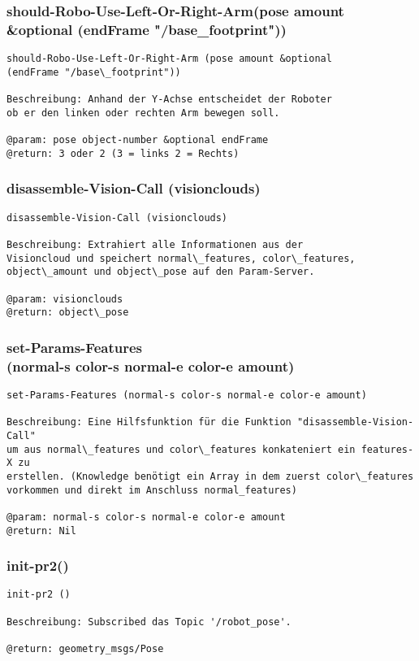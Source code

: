 \documentclass{suturo}
\begin{document}
\subsubsection{should-Robo-Use-Left-Or-Right-Arm(pose amount \\
\&optional (endFrame "/base\_footprint"))}
\begin{verbatim}
should-Robo-Use-Left-Or-Right-Arm (pose amount &optional
(endFrame "/base\_footprint"))

Beschreibung: Anhand der Y-Achse entscheidet der Roboter
ob er den linken oder rechten Arm bewegen soll.

@param: pose object-number &optional endFrame
@return: 3 oder 2 (3 = links 2 = Rechts)
\end{verbatim}


\subsubsection{disassemble-Vision-Call (visionclouds)}
\begin{verbatim}
disassemble-Vision-Call (visionclouds)

Beschreibung: Extrahiert alle Informationen aus der 
Visioncloud und speichert normal\_features, color\_features, 
object\_amount und object\_pose auf den Param-Server.
 
@param: visionclouds
@return: object\_pose
\end{verbatim}



\subsubsection{set-Params-Features \\
(normal-s color-s normal-e color-e amount)}
\begin{verbatim}
set-Params-Features (normal-s color-s normal-e color-e amount)

Beschreibung: Eine Hilfsfunktion für die Funktion "disassemble-Vision-Call" 
um aus normal\_features und color\_features konkateniert ein features-X zu 
erstellen. (Knowledge benötigt ein Array in dem zuerst color\_features 
vorkommen und direkt im Anschluss normal_features)

@param: normal-s color-s normal-e color-e amount
@return: Nil
\end{verbatim}


\subsubsection{init-pr2()}
\begin{verbatim}
init-pr2 ()

Beschreibung: Subscribed das Topic '/robot_pose'.

@return: geometry_msgs/Pose
\end{verbatim}
\end{document}
